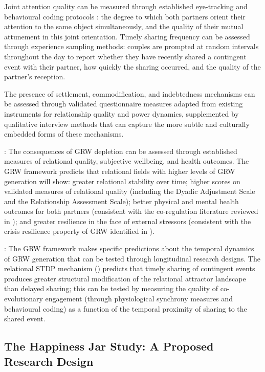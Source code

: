 Joint attention quality can be measured through established eye-tracking and behavioural coding protocols \parencite{hasson2012}: the degree to which both partners orient their attention to the same object simultaneously, and the quality of their mutual attunement in this joint orientation. Timely sharing frequency can be assessed through experience sampling methods: couples are prompted at random intervals throughout the day to report whether they have recently shared a contingent event with their partner, how quickly the sharing occurred, and the quality of the partner's reception.

The presence of settlement, commodification, and indebtedness mechanisms can be assessed through validated questionnaire measures adapted from existing instruments for relationship quality and power dynamics, supplemented by qualitative interview methods that can capture the more subtle and culturally embedded forms of these mechanisms.

: The consequences of GRW depletion can be assessed through established measures of relational quality, subjective wellbeing, and health outcomes. The GRW framework predicts that relational fields with higher levels of GRW generation will show: greater relational stability over time; higher scores on validated measures of relational quality (including the Dyadic Adjustment Scale and the Relationship Assessment Scale); better physical and mental health outcomes for both partners (consistent with the co-regulation literature reviewed in  \parencite{paperxiv}); and greater resilience in the face of external stressors (consistent with the crisis resilience property of GRW identified in ).

: The GRW framework makes specific predictions about the temporal dynamics of GRW generation that can be tested through longitudinal research designs. The relational STDP mechanism () predicts that timely sharing of contingent events produces greater structural modification of the relational attractor landscape than delayed sharing; this can be tested by measuring the quality of co-evolutionary engagement (through physiological synchrony measures and behavioural coding) as a function of the temporal proximity of sharing to the shared event.

\subsection{The Happiness Jar Study: A Proposed Research Design}
\label{p15:subsec:jar_study}

